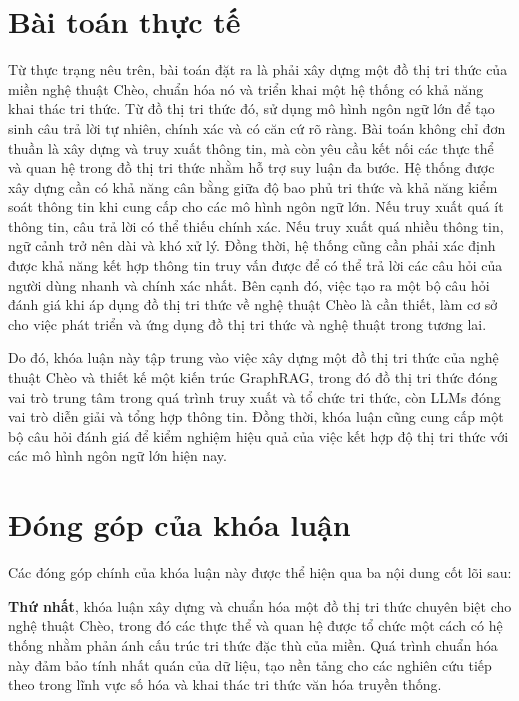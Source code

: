 \section{Bài toán thực tế}

Từ thực trạng nêu trên, bài toán đặt ra là phải xây dựng một đồ thị tri thức của miền nghệ thuật Chèo, chuẩn hóa nó và triển khai một hệ thống có khả năng khai thác tri thức. Từ đồ thị tri thức đó, sử dụng mô hình ngôn ngữ lớn để tạo sinh câu trả lời tự nhiên, chính xác và có căn cứ rõ ràng. Bài toán không chỉ đơn thuần là xây dựng và truy xuất thông tin, mà còn yêu cầu kết nối các thực thể và quan hệ trong đồ thị tri thức nhằm hỗ trợ suy luận đa bước. Hệ thống được xây dựng cần có khả năng cân bằng giữa độ bao phủ tri thức và khả năng kiểm soát thông tin khi cung cấp cho các mô hình ngôn ngữ lớn. Nếu truy xuất quá ít thông tin, câu trả lời có thể thiếu chính xác. Nếu truy xuất quá nhiều thông tin, ngữ cảnh trở nên dài và khó xử lý. Đồng thời, hệ thống cũng cần phải xác định được khả năng kết hợp thông tin truy vấn được để có thể trả lời các câu hỏi của người dùng nhanh và chính xác nhất. Bên cạnh đó, việc tạo ra một bộ câu hỏi đánh giá khi áp dụng đồ thị tri thức về nghệ thuật Chèo là cần thiết, làm cơ sở cho việc phát triển và ứng dụng đồ thị tri thức và nghệ thuật trong tương lai.

Do đó, khóa luận này tập trung vào việc xây dựng một đồ thị tri thức của nghệ thuật Chèo và thiết kế một kiến trúc GraphRAG, trong đó đồ thị tri thức đóng vai trò trung tâm trong quá trình truy xuất và tổ chức tri thức, còn LLMs đóng vai trò diễn giải và tổng hợp thông tin. Đồng thời, khóa luận cũng cung cấp một bộ câu hỏi đánh giá để kiểm nghiệm hiệu quả của việc kết hợp độ thị tri thức với các mô hình ngôn ngữ lớn hiện nay.

\section{Đóng góp của khóa luận}

Các đóng góp chính của khóa luận này được thể hiện qua ba nội dung cốt lõi sau:

\textbf{Thứ nhất}, khóa luận xây dựng và chuẩn hóa một đồ thị tri thức chuyên biệt cho nghệ thuật Chèo, trong đó các thực thể và quan hệ được tổ chức một cách có hệ thống nhằm phản ánh cấu trúc tri thức đặc thù của miền. Quá trình chuẩn hóa này đảm bảo tính nhất quán của dữ liệu, tạo nền tảng cho các nghiên cứu tiếp theo trong lĩnh vực số hóa và khai thác tri thức văn hóa truyền thống.

